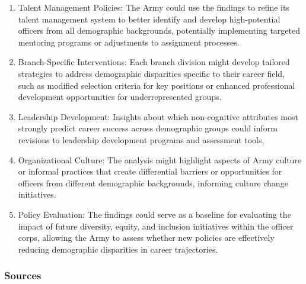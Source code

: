 \documentclass[./main.tex]{subfiles}
\begin{document}
\begin{enumerate}
\def\labelenumi{\arabic{enumi}.}
\item
  Talent Management Policies: The Army could use the findings to refine
  its talent management system to better identify and develop
  high-potential officers from all demographic backgrounds, potentially
  implementing targeted mentoring programs or adjustments to assignment
  processes.
\item
  Branch-Specific Interventions: Each branch division might develop
  tailored strategies to address demographic disparities specific to
  their career field, such as modified selection criteria for key
  positions or enhanced professional development opportunities for
  underrepresented groups.
\item
  Leadership Development: Insights about which non-cognitive attributes
  most strongly predict career success across demographic groups could
  inform revisions to leadership development programs and assessment
  tools.
\item
  Organizational Culture: The analysis might highlight aspects of Army
  culture or informal practices that create differential barriers or
  opportunities for officers from different demographic backgrounds,
  informing culture change initiatives.
\item
  Policy Evaluation: The findings could serve as a baseline for
  evaluating the impact of future diversity, equity, and inclusion
  initiatives within the officer corps, allowing the Army to assess
  whether new policies are effectively reducing demographic disparities
  in career trajectories.
\end{enumerate}

\subsubsection{Sources}\label{sources}
\end{document}
